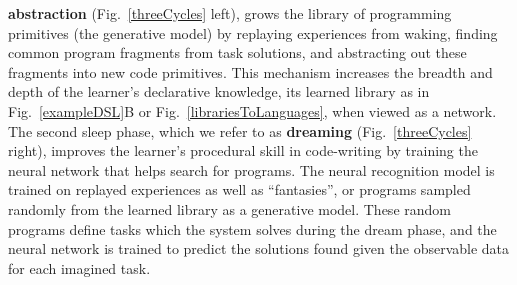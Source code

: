 \documentclass[12pt]{article}
\begin{document}
\textbf{abstraction} (Fig.~\ref{threeCycles} left),
grows the library of programming primitives (the generative model) by replaying
experiences from waking, finding common program fragments from task solutions, and abstracting out these fragments into new code
primitives.
This mechanism increases the breadth and depth of the learner's declarative knowledge, its learned library as in Fig.~\ref{exampleDSL}B or Fig.~\ref{librariesToLanguages}, when viewed as a network.
The second sleep phase, which we refer to as \textbf{dreaming} (Fig.~\ref{threeCycles} right),
improves the
learner's procedural skill in code-writing by training the neural network that helps %
search for programs.
The neural recognition model is trained on replayed experiences as well as ``fantasies'', or programs sampled randomly from the learned library as a generative model. These random programs define tasks which the system solves during the dream phase, and the neural network is trained to predict the solutions found given the observable data for each imagined task.  
\end{document}
